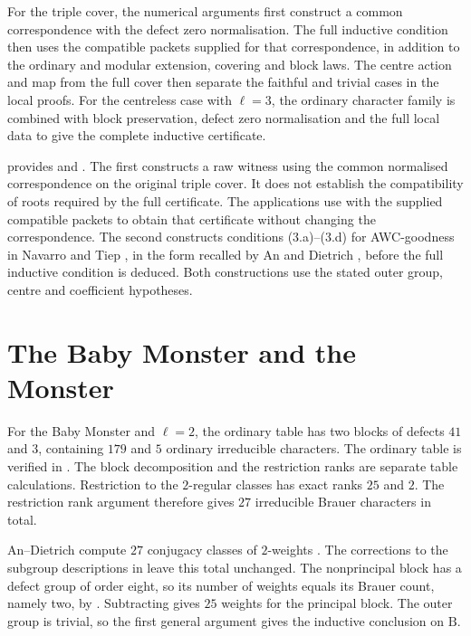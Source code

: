\begingroup{}
For the triple cover, the numerical arguments first construct a common
correspondence with the defect zero normalisation. The full inductive
condition then uses the compatible packets supplied for that correspondence,
in addition to the ordinary and modular extension, covering and block laws.
The centre action and map from the full cover then separate the faithful and
trivial cases in the local proofs. For the centreless case with $\ell=3$, the
ordinary character family is combined with block preservation, defect zero
normalisation and the full local data to give the complete inductive
certificate.
\par\endgroup

\begin{implementation}
 provides
 and
.
The first constructs a raw witness using the common normalised correspondence
on the original triple cover. It does not establish the compatibility of
roots required by the full certificate. The applications use
 with the supplied compatible packets to obtain
that certificate without changing the correspondence.
The second constructs conditions (3.a)--(3.d)
for AWC-goodness in Navarro and Tiep \cite[\S3.3]{NavarroTiep2011},
in the form recalled by An and Dietrich
\cite[Definition~4.4]{AnDietrich2012}, before the full inductive
condition is deduced. Both constructions use the stated outer group, centre and coefficient
hypotheses.
\end{implementation}

\section{The Baby Monster and the Monster}

For the Baby Monster and $\ell=2$, the ordinary table has two blocks of defects
$41$ and $3$, containing $179$ and $5$ ordinary irreducible characters. The
ordinary table is verified in
\cite[Section~7]{BreuerMagaardWilsonBaby2020}. The block decomposition and
the restriction ranks are separate table calculations. Restriction to
the $2$-regular classes has exact ranks $25$ and $2$. The restriction rank
argument therefore gives $27$ irreducible Brauer characters in total.

An--Dietrich compute $27$ conjugacy classes of $2$-weights
\cite[proof of Theorem~4.2 and Table~2]{AnDietrich2012}.
The corrections to the subgroup descriptions in
\cite[Table~2]{AnDietrichErratum} leave this total unchanged.
The nonprincipal block has a defect group of order eight, so its number
of weights equals its Brauer count, namely two, by
\cite[Theorem~13.7]{Sambale2014}. Subtracting gives $25$ weights for the
principal block. The outer group is trivial, so the first general argument
gives the inductive conclusion on $\mathrm B$.

